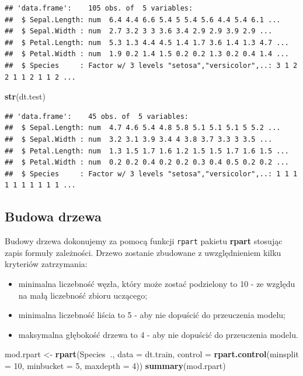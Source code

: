 \documentclass[]{book}
\newenvironment{Shaded}{\begin{snugshade}}{\end{snugshade}}
\newcommand{\DataTypeTok}[1]{\textcolor[rgb]{0.13,0.29,0.53}{#1}}
\newcommand{\DecValTok}[1]{\textcolor[rgb]{0.00,0.00,0.81}{#1}}
\newcommand{\KeywordTok}[1]{\textcolor[rgb]{0.13,0.29,0.53}{\textbf{#1}}}
\newcommand{\NormalTok}[1]{#1}
\newcommand{\OperatorTok}[1]{\textcolor[rgb]{0.81,0.36,0.00}{\textbf{#1}}}
\newcommand{\StringTok}[1]{\textcolor[rgb]{0.31,0.60,0.02}{#1}}
\providecommand{\tightlist}{%
  \setlength{\itemsep}{0pt}\setlength{\parskip}{0pt}}
\theoremstyle{plain}
\theoremstyle{definition}
\begin{document}
\begin{verbatim}
## 'data.frame':    105 obs. of  5 variables:
##  $ Sepal.Length: num  6.4 4.4 6.6 5.4 5 5.4 5.6 4.4 5.4 6.1 ...
##  $ Sepal.Width : num  2.7 3.2 3 3 3.6 3.4 2.9 2.9 3.9 2.9 ...
##  $ Petal.Length: num  5.3 1.3 4.4 4.5 1.4 1.7 3.6 1.4 1.3 4.7 ...
##  $ Petal.Width : num  1.9 0.2 1.4 1.5 0.2 0.2 1.3 0.2 0.4 1.4 ...
##  $ Species     : Factor w/ 3 levels "setosa","versicolor",..: 3 1 2 2 1 1 2 1 1 2 ...
\end{verbatim}

\begin{Shaded}
\begin{Highlighting}[]
\KeywordTok{str}\NormalTok{(dt.test)}
\end{Highlighting}
\end{Shaded}

\begin{verbatim}
## 'data.frame':    45 obs. of  5 variables:
##  $ Sepal.Length: num  4.7 4.6 5.4 4.8 5.8 5.1 5.1 5.1 5 5.2 ...
##  $ Sepal.Width : num  3.2 3.1 3.9 3.4 4 3.8 3.7 3.3 3 3.5 ...
##  $ Petal.Length: num  1.3 1.5 1.7 1.6 1.2 1.5 1.5 1.7 1.6 1.5 ...
##  $ Petal.Width : num  0.2 0.2 0.4 0.2 0.2 0.3 0.4 0.5 0.2 0.2 ...
##  $ Species     : Factor w/ 3 levels "setosa","versicolor",..: 1 1 1 1 1 1 1 1 1 1 ...
\end{verbatim}

\hypertarget{budowa-drzewa}{%
\subsection{Budowa drzewa}\label{budowa-drzewa}}

Budowy drzewa dokonujemy za pomocą funkcji \texttt{rpart} pakietu \textbf{rpart} \citep{R-rpart} stosując zapis formuły zależności. Drzewo zostanie zbudowane z uwzględnieniem kilku kryteriów zatrzymania:

\begin{itemize}
\tightlist
\item
  minimalna liczebność węzła, który może zostać podzielony to 10 - ze względu na małą liczebność zbioru uczącego;
\item
  minimalna liczebność liścia to 5 - aby nie dopuścić do przeuczenia modelu;
\item
  maksymalna głębokość drzewa to 4 - aby nie dopuścić do przeuczenia modelu.
\end{itemize}

\begin{Shaded}
\begin{Highlighting}[]
\NormalTok{mod.rpart <-}\StringTok{ }\KeywordTok{rpart}\NormalTok{(Species}\OperatorTok{~}\NormalTok{., }\DataTypeTok{data =}\NormalTok{ dt.train, }
                   \DataTypeTok{control =} \KeywordTok{rpart.control}\NormalTok{(}\DataTypeTok{minsplit =} \DecValTok{10}\NormalTok{,}
                                           \DataTypeTok{minbucket =} \DecValTok{5}\NormalTok{,}
                                           \DataTypeTok{maxdepth =} \DecValTok{4}\NormalTok{))}
\KeywordTok{summary}\NormalTok{(mod.rpart)}
\end{Highlighting}
\end{Shaded}
\end{document}
